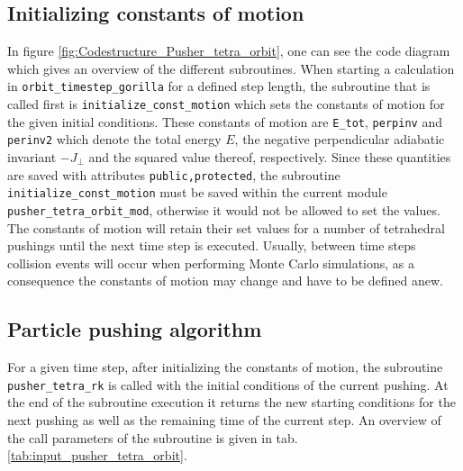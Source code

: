 \documentclass[./main.tex]{subfiles}
\begin{document}
\subsection{Initializing constants of motion}
In figure \ref{fig:Codestructure_Pusher_tetra_orbit}, one can see the code diagram which gives an overview of the different subroutines. When starting a calculation in \texttt{orbit\_timestep\_gorilla} for a defined step length, the subroutine that is called first is \texttt{initialize\_const\_motion} which sets the constants of motion for the given initial conditions. These constants of motion are \texttt{E\_tot}, \texttt{perpinv} and \texttt{perinv2} which denote the total energy $E$, the negative perpendicular adiabatic invariant $-J_\perp$ and the squared value thereof, respectively. Since these quantities are saved with attributes \texttt{public,protected}, the subroutine \texttt{initialize\_const\_motion} must be saved within the current module \texttt{pusher\_tetra\_orbit\_mod}, otherwise it would not be allowed to set the values. The constants of motion will retain their set values for a number of tetrahedral pushings until the next time step is executed. Usually, between time steps collision events will occur when performing Monte Carlo simulations, as a consequence the constants of motion may change and have to be defined anew.


\subsection{Particle pushing algorithm}
For a given time step, after initializing the constants of motion, the subroutine \texttt{pusher\_tetra\_rk} is called with the initial conditions of the current pushing. At the end of the subroutine execution it returns the new starting conditions for the next pushing as well as the remaining time of the current step. An overview of the call parameters of the subroutine is given in tab. \ref{tab:input_pusher_tetra_orbit}.
\end{document}
